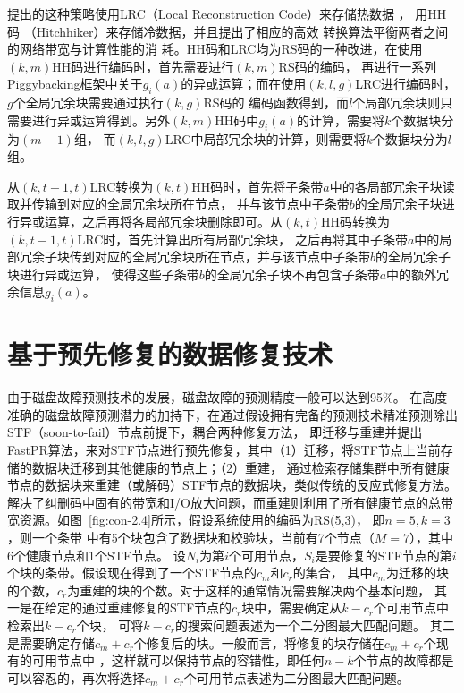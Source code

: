 \citet{wang2020adaptive}提出的这种策略使用LRC（Local
Reconstruction Code）来存储热数据 ， 用HH码
（Hitchhiker）来存储冷数据，并且提出了相应的高效
转换算法平衡两者之间的网络带宽与计算性能的消
耗。HH码和LRC均为RS码的一种改进，在使用$(k,m)$HH码进行编码时，首先需要进行$(k,m)$RS码的编码，
再进行一系列Piggybacking框架中关于$g_i(a)$的异或运算；而在使用$(k,l,g)$LRC进行编码时，$g$个全局冗余块需要通过执行$(k,g)$RS码的
编码函数得到，而$l$个局部冗余块则只需要进行异或运算得到。另外$(k,m)$HH码中$g_i(a)$的计算，需要将$k$个数据块分为$(m-1)$组，
而$(k,l,g)$LRC中局部冗余块的计算，则需要将$k$个数据块分为$l$组。

从$(k,t-1,t)$LRC转换为$(k,t)$HH码时，首先将子条带$a$中的各局部冗余子块读取并传输到对应的全局冗余块所在节点，
并与该节点中子条带$b$的全局冗余子块进行异或运算，之后再将各局部冗余块删除即可。从$(k,t)$HH码转换为$(k,t-1,t)$LRC时，首先计算出所有局部冗余块，
之后再将其中子条带$a$中的局部冗余子块传到对应的全局冗余块所在节点，并与该节点中子条带$b$的全局冗余子块进行异或运算，
使得这些子条带$b$的全局冗余子块不再包含子条带$a$中的额外冗余信息$g_i(a)$。


\section{基于预先修复的数据修复技术}

由于磁盘故障预测技术的发展，磁盘故障的预测精度一般可以达到95\%\citep{botezatu2016predicting,li2014hard,mahdisoltani2017proactive,zhu2013proactive}。
在高度准确的磁盘故障预测潜力的加持下，\citet{shen2019fast}在通过假设拥有完备的预测技术精准预测除出STF（soon-to-fail）节点前提下，耦合两种修复方法，
即迁移与重建并提出FastPR算法，来对STF节点进行预先修复，其中（1）迁移，将STF节点上当前存储的数据块迁移到其他健康的节点上；（2）重建，
通过检索存储集群中所有健康节点的数据块来重建（或解码）STF节点的数据块，类似传统的反应式修复方法。
解决了纠删码中固有的带宽和I/O放大问题，而重建则利用了所有健康节点的总带宽资源。如图~\ref{fig:con-2.4}所示，假设系统使用的编码为RS(5,3)，
即$n=5,k=3$，则一个条带
中有5个块包含了数据块和校验块，当前有7个节点（$M=7$），其中6个健康节点和1个STF节点。
设$N_i$为第$i$个可用节点，$S_i$是要修复的STF节点的第$i$个块的条带。假设现在得到了一个STF节点的$c_m$和$c_r$的集合，
其中$c_m$为迁移的块的个数，$c_r$为重建的块的个数。对于这样的通常情况需要解决两个基本问题，
其一是在给定的通过重建修复的STF节点的$c_r$块中，需要确定从$k-c_r$个可用节点中检索出$k-c_r$个块，
可将$k-c_r$的搜索问题表述为一个二分图最大匹配问题。
其二是需要确定存储$c_m+c_r$个修复后的块。一般而言，将修复的块存储在$c_m+c_r$个现有的可用节点中
，这样就可以保持节点的容错性，即任何$n-k$个节点的故障都是可以容忍的，再次将选择$c_m+c_r$个可用节点表述为二分图最大匹配问题。


